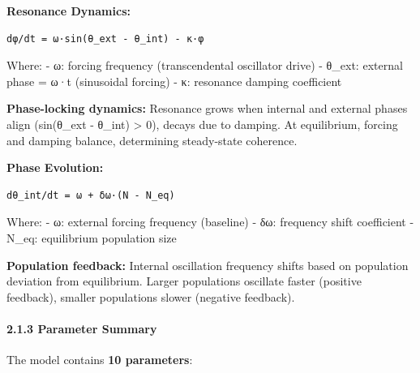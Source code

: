 \documentclass[
]{article}
\begin{document}
\textbf{Resonance Dynamics:}

\begin{verbatim}
dφ/dt = ω·sin(θ_ext - θ_int) - κ·φ
\end{verbatim}

Where: - ω: forcing frequency (transcendental oscillator drive) -
θ\_ext: external phase = ω·t (sinusoidal forcing) - κ: resonance damping
coefficient

\textbf{Phase-locking dynamics:} Resonance grows when internal and
external phases align (sin(θ\_ext - θ\_int) \textgreater{} 0), decays
due to damping. At equilibrium, forcing and damping balance, determining
steady-state coherence.

\textbf{Phase Evolution:}

\begin{verbatim}
dθ_int/dt = ω + δω·(N - N_eq)
\end{verbatim}

Where: - ω: external forcing frequency (baseline) - δω: frequency shift
coefficient - N\_eq: equilibrium population size

\textbf{Population feedback:} Internal oscillation frequency shifts
based on population deviation from equilibrium. Larger populations
oscillate faster (positive feedback), smaller populations slower
(negative feedback).

\paragraph{2.1.3 Parameter Summary}\label{parameter-summary}

The model contains \textbf{10 parameters}:
\end{document}
